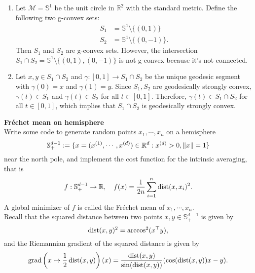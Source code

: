 \documentclass[en, oneside]{assignment}
\begin{document}
\begin{sol}
    \begin{enumerate}[label=(\arabic*)]
        \item Let $\mathcal M = \mathbb S ^1$ be the unit circle in $\mathbb R^2$ with the standard metric. Define the following two g-convex sets:
        \begin{align*}
            S_1 &= \mathbb S ^1 \setminus \{(0, 1)\}\\
            S_2 &= \mathbb S ^1 \setminus \{(0, -1)\}.
        \end{align*}
        Then $S_1$ and $S_2$ are g-convex sets. However, the intersection $S_1 \cap S_2 = \mathbb S ^1 \setminus \{(0, 1), (0, -1)\}$ is not g-convex 
        because it's not connected.
        \item Let $x, y \in S_1 \cap S_2$ and $\gamma : [0, 1] \rightarrow S_1 \cap S_2$ be the unique geodesic segment with $\gamma(0) = x$ and $\gamma(1) = y$.
        Since $S_1, S_2$ are geodesically strongly convex, $\gamma(t) \in S_1$ and $\gamma(t) \in S_2$ for all $t \in [0, 1]$. 
        Therefore, $\gamma(t) \in S_1 \cap S_2$ for all $t \in [0, 1]$, which implies that $S_1 \cap S_2$ is geodesically strongly convex.
    \end{enumerate}
\end{sol}

\begin{prob} \textbf{Fréchet mean on hemisphere}\\
    Write some code to generate random points $x_1, \cdots, x_n$ on a hemisphere
    \begin{equation*}
        \mathbb S ^{d-1}_+:= \{x = (x^{(1)}, \cdots, x^{(d)}) \in \mathbb R^d : x^{(d)} > 0, \left\lVert x\right\rVert = 1\}
    \end{equation*}
    near the north pole, and implement the cost function for the intrinsic averaging, that is
    \begin{equation*}
        f: \mathbb S ^{d-1}_+ \rightarrow \mathbb R, \quad f(x) = \frac{1}{2n} \sum_{i=1}^n \operatorname{dist} (x, x_i)^2.
    \end{equation*}
    A global minimizer of $f$ is called the Fréchet mean of $x_1, \cdots, x_n$.\\
    Recall that the squared distance between two points $x, y \in \mathbb S ^{d-1}_+$ is given by
    \begin{equation*}
        \operatorname{dist}(x, y)^2 = \arccos^2(x^\top y),
    \end{equation*}
    and the Riemannian gradient of the squared distance is given by
    \begin{equation*}
        \operatorname{grad} \left(x \mapsto \frac{1}{2} \operatorname{dist} (x, y)\right)(x) = \frac{\operatorname{dist}(x, y)}{\sin(\operatorname{dist}(x, y))} (\cos(\operatorname{dist}(x, y)) x - y).
    \end{equation*}
\end{prob}
\end{document}
